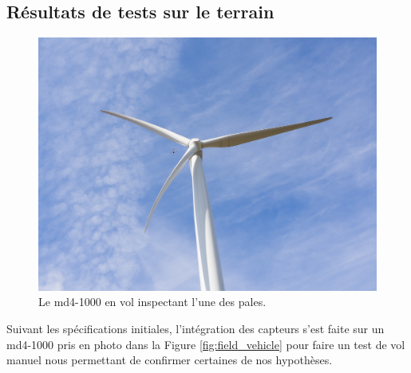 \clearpage
\subsection{Résultats de tests sur le terrain}
\label{subsec:results_field}

\begin{figure}[htb]
  \centering
  \includegraphics[trim=180 200 180 180,clip,width=\linewidth]{images/test_eolienne.jpg}
  \caption{Le md4-1000 en vol inspectant l'une des pales.}
  \label{fig:test_eolienne}
\end{figure}

Suivant les spécifications initiales, l'intégration des capteurs s'est faite sur un md4-1000 pris en photo dans la Figure \ref{fig:field_vehicle} pour faire un test de vol manuel nous permettant de confirmer certaines de nos hypothèses.

